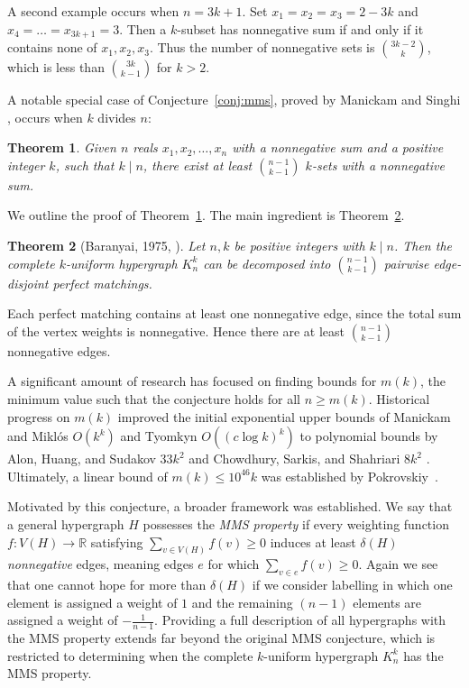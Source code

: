 \documentclass[12pt,UKenglish]{amsart}
\newtheorem{thm}{Theorem}[section]
\theoremstyle{plain}
\theoremstyle{definition}
\theoremstyle{remark}
\begin{document}
A second example occurs when $n=3k+1$. Set $x_1=x_2=x_3=2-3k$ and $x_4=\dots=x_{3k+1}=3$. Then a $k$-subset has nonnegative sum if and only if it contains none of $x_1,x_2,x_3$. Thus the number of nonnegative sets is $\binom{3k-2}{k}$, which is less than $\binom{3k}{k-1}$ for $k>2$.

A notable special case of Conjecture~\ref{conj:mms}, proved by Manickam and Singhi \cite{manickam1988first}, occurs when $k$ divides $n$:

\begin{thm}\label{thm:baranyai}
  Given $n$ reals $x_1, x_2, \dots, x_n$ with a nonnegative sum and a positive integer $k$, such that $k \mid n$, there exist at least $\binom{n-1}{k-1}$ $k$-sets with a nonnegative sum.
\end{thm}

We outline the proof of Theorem~\ref{thm:baranyai}. The main ingredient is Theorem~\ref{thm:baranyai-decomposition}.
\begin{thm}[Baranyai, 1975, \cite{baranyai1975factorization}]\label{thm:baranyai-decomposition}
  Let $n,k$ be positive integers with $k\mid n$. Then the complete $k$-uniform hypergraph $K_n^k$ can be decomposed into $\binom{n-1}{k-1}$ pairwise edge-disjoint perfect matchings.
\end{thm}
\noindent Each perfect matching contains at least one nonnegative edge, since the total sum of the vertex weights is nonnegative. Hence there are at least $\binom{n-1}{k-1}$ nonnegative edges.

A significant amount of research has focused on finding bounds for $m(k)$, the minimum value such that the conjecture holds for all $n \geq m(k)$. Historical progress on $m(k)$ improved the initial exponential upper bounds of Manickam and Mikl\'os $O(k^k)$ \cite{manickam1987number} and Tyomkyn $O((c \log k)^k)$ \cite{tyomkyn2012improved} to polynomial bounds by Alon, Huang, and Sudakov $33k^2$ \cite{ALON2012784} and Chowdhury, Sarkis, and Shahriari $8k^2$ \cite{chowdhury2014manickam}. Ultimately, a linear bound of $m(k) \leq 10^{46}k$ was established by Pokrovskiy~\cite{POKROVSKIY2015280}.

Motivated by this conjecture, a broader framework was established. We say that a general hypergraph $H$ possesses the \emph{MMS property} if every weighting function $f: V(H) \to \mathbb{R}$ satisfying $\sum_{v \in V(H)} f(v) \ge 0$ induces at least $\delta(H)$ \emph{nonnegative} edges, meaning edges $e$ for which $\sum_{v \in e} f(v) \ge 0$. Again we see that one cannot hope for more than $\delta(H)$ if we consider labelling in which one element is assigned a weight of $1$ and the remaining $(n-1)$ elements are assigned a weight of $-\frac{1}{n-1}$. Providing a full description of all hypergraphs with the MMS property extends far beyond the original MMS conjecture, which is restricted to determining when the complete $k$-uniform hypergraph $K_n^k$ has the MMS property.
\end{document}

